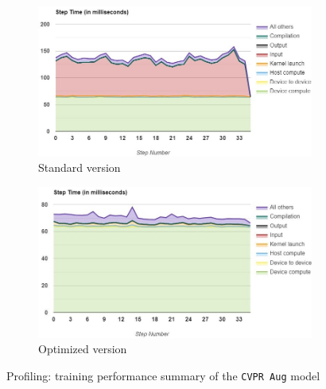 \begin{figure}[!h]
	\begin{center}
		\begin{subfigure}[h]{0.49\textwidth}
			\centering
			\includegraphics[width=1\textwidth]{"contents/images/05-profiling-CVPRaug-std-summary"}
			\caption[]{Standard version}
		\end{subfigure}
		\hfill
		\begin{subfigure}[h]{0.49\textwidth}
			\centering
			\includegraphics[width=1\textwidth]{"contents/images/05-profiling-CVPRaug-opt-summary"}
			\caption[]{Optimized version}
		\end{subfigure}
	\end{center}
	\vspace{-0.5cm}
	\caption[Profiling: training performance summary of the \texttt{CVPR Aug} model]{Profiling: training performance summary of the \texttt{CVPR Aug} model}
	\label{fig:profiling-cvpraug-summary}
\end{figure}

